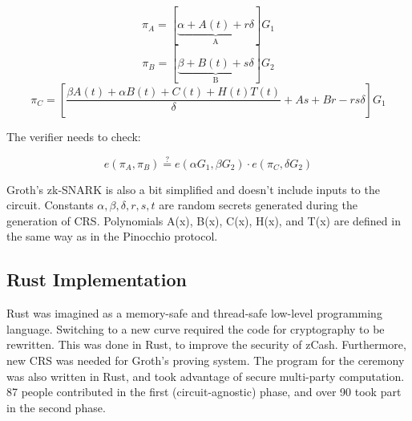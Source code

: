$$ \pi_A = [\underbrace{\alpha + A(t) + r\delta}_\text{A}]G_1 $$
$$ \pi_B = [\underbrace{\beta + B(t) + s\delta}_\text{B}]G_2 $$
$$ \pi_C = [\frac{\beta A(t) + \alpha B(t) + C(t) + H(t)T(t)}{\delta} + As + Br - rs\delta]G_1 $$

The verifier needs to check:

$$ e(\pi_A, \pi_B) \stackrel{?}{=} e(\alpha G_1, \beta G_2) \cdot e(\pi_C, \delta G_2) $$

Groth's zk-SNARK is also a bit simplified and doesn't include inputs to the circuit. Constants $\alpha, \beta, \delta, r, s, t$ are random secrets generated during the generation of CRS. Polynomials A(x), B(x), C(x), H(x), and T(x) are defined in the same way as in the Pinocchio protocol.

\subsection{Rust Implementation}

Rust was imagined as a memory-safe and thread-safe low-level programming language. Switching to a new curve required the code for cryptography to be rewritten. This was done in Rust, to improve the security of zCash. Furthermore, new CRS was needed for Groth's proving system. The program for the ceremony was also written in Rust, and took advantage of secure multi-party computation. 87 people contributed in the first (circuit-agnostic) phase, and over 90 took part in the second phase.